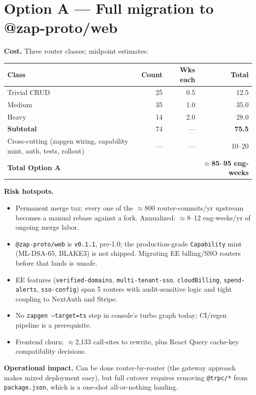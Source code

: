 \documentclass[11pt,letterpaper]{article}
\begin{document}
\section{Option A --- Full migration to @zap-proto/web}
\textbf{Cost.} Three router classes; midpoint estimates:
\begin{center}
\begin{tabular}{lrrr}
\toprule
Class & Count & Wks each & Total \\
\midrule
Trivial CRUD & 25 & 0.5 & 12.5 \\
Medium & 35 & 1.0 & 35.0 \\
Heavy & 14 & 2.0 & 28.0 \\
\midrule
\textbf{Subtotal} & 74 & --- & \textbf{75.5} \\
Cross-cutting (zapgen wiring, capability mint, auth, tests, rollout) & --- & --- & 10--20 \\
\midrule
\textbf{Total Option A} & & & \textbf{$\approx$85--95 eng-weeks} \\
\bottomrule
\end{tabular}
\end{center}

\textbf{Risk hotspots.}
\begin{itemize}[leftmargin=1.2em,itemsep=2pt]
  \item Permanent merge tax: every one of the $\approx$800 router-commits/yr upstream becomes a manual rebase against a fork. Annualized: $\approx$8--12 eng-weeks/yr of ongoing merge labor.
  \item \texttt{@zap-proto/web} is \texttt{v0.1.1}, pre-1.0; the production-grade \texttt{Capability} mint (ML-DSA-65, BLAKE3) is not shipped. Migrating EE billing/SSO routers before that lands is unsafe.
  \item EE features (\texttt{verified-domains}, \texttt{multi-tenant-sso}, \texttt{cloudBilling}, \texttt{spend-alerts}, \texttt{sso-config}) span 5 routers with audit-sensitive logic and tight coupling to NextAuth and Stripe.
  \item No \texttt{zapgen --target=ts} step in console's turbo graph today; CI/regen pipeline is a prerequisite.
  \item Frontend churn: $\approx$2{,}133 call-sites to rewrite, plus React Query cache-key compatibility decisions.
\end{itemize}

\textbf{Operational impact.} Can be done router-by-router (the gateway approach makes mixed deployment easy), but full cutover requires removing \texttt{@trpc/*} from \texttt{package.json}, which is a one-shot all-or-nothing landing.
\end{document}

